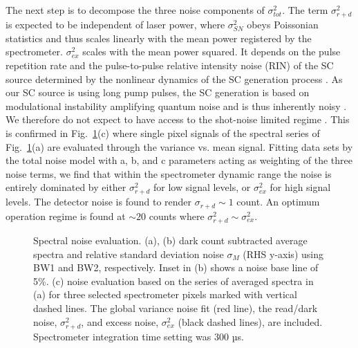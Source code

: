 \documentclass[9pt,twocolumn]{extarticle}
\begin{document}
The next step is to decompose the three noise components of $\sigma^2_{tot}$. The term $\sigma_{r+d}^2$ is expected to be independent of laser power, where $\sigma_{SN}^2$ obeys Poissonian statistics and thus scales linearly with the mean power registered by the spectrometer. $\sigma_{ex}^2$ scales with the mean power squared. It depends on the pulse repetition rate and the pulse-to-pulse relative intensity noise (RIN) of the SC source determined by the nonlinear dynamics of the SC generation process \cite{kwarkye2020amplifier}. As our SC source is using long pump pulses, the SC generation is based on modulational instability amplifying quantum noise and is thus inherently noisy \cite{Dud06Rev}. We therefore do not expect to have access to the shot-noise limited regime \cite{jensen2020shot}. %
This is confirmed in Fig.~\ref{noise}(c) where single pixel signals of the spectral series of Fig.~\ref{noise}(a) are evaluated through the variance vs. mean signal. Fitting data sets by the total noise model with a, b, and c parameters acting as weighting of the three noise terms, we find that within the spectrometer dynamic range the noise is entirely dominated by either $\sigma_{r+d}^2$ for low signal levels, or $\sigma_{ex}^2$ for high signal levels. The detector noise is found to render $\sigma_{r+d}\sim 1$ count. An optimum operation regime is found at $\sim 20 $ counts where $\sigma_{r+d}^2\sim\sigma_{ex}^2$.


\begin{figure}[h!]
\centering
{}
\caption{Spectral noise evaluation. (a), (b) dark count subtracted average spectra and relative standard deviation noise $\sigma_M$ (RHS y-axis) using BW1 and BW2, respectively. Inset in (b) shows a noise base line of 5\%. (c) noise evaluation based on the series of averaged spectra in (a) for three selected spectrometer pixels marked with vertical dashed lines. The global variance noise fit (red line), the read/dark noise, $\sigma_{r+d}^2$, and excess noise, $\sigma_{ex}^2$ (black dashed lines), are included. Spectrometer integration time setting was 300 µs.}
\label{noise}
\end{figure}
\end{document}
